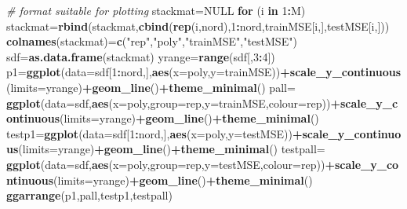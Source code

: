 \documentclass[]{article}
\newenvironment{Shaded}{\begin{snugshade}}{\end{snugshade}}
\newcommand{\CommentTok}[1]{\textcolor[rgb]{0.56,0.35,0.01}{\textit{#1}}}
\newcommand{\ControlFlowTok}[1]{\textcolor[rgb]{0.13,0.29,0.53}{\textbf{#1}}}
\newcommand{\DataTypeTok}[1]{\textcolor[rgb]{0.13,0.29,0.53}{#1}}
\newcommand{\DecValTok}[1]{\textcolor[rgb]{0.00,0.00,0.81}{#1}}
\newcommand{\KeywordTok}[1]{\textcolor[rgb]{0.13,0.29,0.53}{\textbf{#1}}}
\newcommand{\NormalTok}[1]{#1}
\newcommand{\OperatorTok}[1]{\textcolor[rgb]{0.81,0.36,0.00}{\textbf{#1}}}
\newcommand{\OtherTok}[1]{\textcolor[rgb]{0.56,0.35,0.01}{#1}}
\newcommand{\StringTok}[1]{\textcolor[rgb]{0.31,0.60,0.02}{#1}}
\begin{document}
\begin{Shaded}
\begin{Highlighting}[]
\CommentTok{# format suitable for plotting }
\NormalTok{stackmat=}\OtherTok{NULL}
\ControlFlowTok{for}\NormalTok{ (i }\ControlFlowTok{in} \DecValTok{1}\OperatorTok{:}\NormalTok{M) stackmat=}\KeywordTok{rbind}\NormalTok{(stackmat,}\KeywordTok{cbind}\NormalTok{(}\KeywordTok{rep}\NormalTok{(i,nord),}\DecValTok{1}\OperatorTok{:}\NormalTok{nord,trainMSE[i,],testMSE[i,]))}
\KeywordTok{colnames}\NormalTok{(stackmat)=}\KeywordTok{c}\NormalTok{(}\StringTok{"rep"}\NormalTok{,}\StringTok{"poly"}\NormalTok{,}\StringTok{"trainMSE"}\NormalTok{,}\StringTok{"testMSE"}\NormalTok{)}
\NormalTok{sdf=}\KeywordTok{as.data.frame}\NormalTok{(stackmat) }
\NormalTok{yrange=}\KeywordTok{range}\NormalTok{(sdf[,}\DecValTok{3}\OperatorTok{:}\DecValTok{4}\NormalTok{])}
\NormalTok{p1=}\KeywordTok{ggplot}\NormalTok{(}\DataTypeTok{data=}\NormalTok{sdf[}\DecValTok{1}\OperatorTok{:}\NormalTok{nord,],}\KeywordTok{aes}\NormalTok{(}\DataTypeTok{x=}\NormalTok{poly,}\DataTypeTok{y=}\NormalTok{trainMSE))}\OperatorTok{+}\KeywordTok{scale_y_continuous}\NormalTok{(}\DataTypeTok{limits=}\NormalTok{yrange)}\OperatorTok{+}\KeywordTok{geom_line}\NormalTok{()}\OperatorTok{+}\KeywordTok{theme_minimal}\NormalTok{()}
\NormalTok{pall=}\StringTok{ }\KeywordTok{ggplot}\NormalTok{(}\DataTypeTok{data=}\NormalTok{sdf,}\KeywordTok{aes}\NormalTok{(}\DataTypeTok{x=}\NormalTok{poly,}\DataTypeTok{group=}\NormalTok{rep,}\DataTypeTok{y=}\NormalTok{trainMSE,}\DataTypeTok{colour=}\NormalTok{rep))}\OperatorTok{+}\KeywordTok{scale_y_continuous}\NormalTok{(}\DataTypeTok{limits=}\NormalTok{yrange)}\OperatorTok{+}\KeywordTok{geom_line}\NormalTok{()}\OperatorTok{+}\KeywordTok{theme_minimal}\NormalTok{()}
\NormalTok{testp1=}\KeywordTok{ggplot}\NormalTok{(}\DataTypeTok{data=}\NormalTok{sdf[}\DecValTok{1}\OperatorTok{:}\NormalTok{nord,],}\KeywordTok{aes}\NormalTok{(}\DataTypeTok{x=}\NormalTok{poly,}\DataTypeTok{y=}\NormalTok{testMSE))}\OperatorTok{+}\KeywordTok{scale_y_continuous}\NormalTok{(}\DataTypeTok{limits=}\NormalTok{yrange)}\OperatorTok{+}\KeywordTok{geom_line}\NormalTok{()}\OperatorTok{+}\KeywordTok{theme_minimal}\NormalTok{()}
\NormalTok{testpall=}\StringTok{ }\KeywordTok{ggplot}\NormalTok{(}\DataTypeTok{data=}\NormalTok{sdf,}\KeywordTok{aes}\NormalTok{(}\DataTypeTok{x=}\NormalTok{poly,}\DataTypeTok{group=}\NormalTok{rep,}\DataTypeTok{y=}\NormalTok{testMSE,}\DataTypeTok{colour=}\NormalTok{rep))}\OperatorTok{+}\KeywordTok{scale_y_continuous}\NormalTok{(}\DataTypeTok{limits=}\NormalTok{yrange)}\OperatorTok{+}\KeywordTok{geom_line}\NormalTok{()}\OperatorTok{+}\KeywordTok{theme_minimal}\NormalTok{()}
\KeywordTok{ggarrange}\NormalTok{(p1,pall,testp1,testpall)}
\end{Highlighting}
\end{Shaded}
\end{document}
